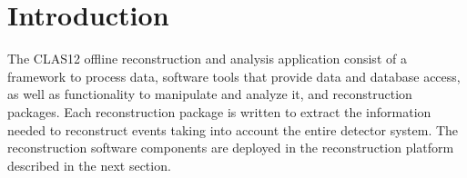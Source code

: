 \section{Introduction}

The CLAS12 offline reconstruction and analysis application consist of a framework to process data,
software tools that provide data and database access, as well as functionality to manipulate and
analyze it, and reconstruction packages.  Each reconstruction package is written to extract
the information needed to reconstruct events taking into account the entire detector system.
The reconstruction software components are deployed in the reconstruction platform described
in the next section.

